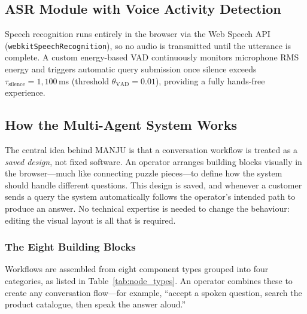 \documentclass[10pt, a4paper, twocolumn]{article}
\begin{document}
\subsection{ASR Module with Voice Activity Detection}

Speech recognition runs entirely in the browser via the Web Speech API
(\texttt{webkitSpeechRecognition}), so no audio is transmitted until the
utterance is complete.
A custom energy-based VAD continuously monitors microphone RMS energy and
triggers automatic query submission once silence exceeds
$\tau_\text{silence} = 1{,}100$\,ms (threshold $\theta_\text{VAD} = 0.01$),
providing a fully hands-free experience.

\subsection{How the Multi-Agent System Works}

The central idea behind MANJU is that a conversation workflow is treated
as a \textit{saved design}, not fixed software.
An operator arranges building blocks visually in the browser---much like
connecting puzzle pieces---to define how the system should handle different
questions.
This design is saved, and whenever a customer sends a query the system
automatically follows the operator's intended path to produce an answer.
No technical expertise is needed to change the behaviour: editing the
visual layout is all that is required.

\subsubsection{The Eight Building Blocks}

Workflows are assembled from eight component types grouped into four
categories, as listed in Table~\ref{tab:node_types}.
An operator combines these to create any conversation flow---for example,
``accept a spoken question, search the product catalogue, then speak the
answer aloud.''
\end{document}
